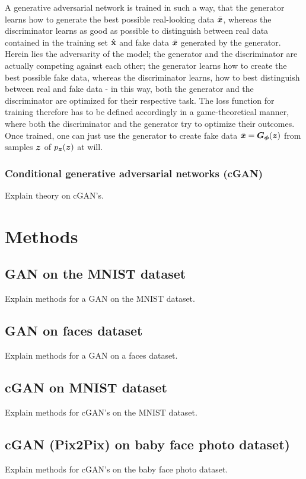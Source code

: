 \documentclass[a4paper,10pt, twocolumn]{article}
\begin{document}
A generative adversarial network is trained in such a way, that the generator learns how to generate the best possible real-looking data $\bar{\bm{x}}$, whereas the discriminator learns as good as possible to distinguish between real data contained in the training set $\hat{\boldsymbol{\mathbf{x}}}$ and fake data $\bar{\bm{x}}$ generated by the generator. Herein lies the adversarity of the model; the generator and the discriminator are actually competing against each other; the generator learns how to create the best possible fake data, whereas the discriminator learns, how to best distinguish between real and fake data - in this way, both the generator and the discriminator are optimized for their respective task. The loss function for training therefore has to be defined accordingly in a game-theoretical manner, where both the discriminator and the generator try to optimize their outcomes. Once trained, one can just use the generator to create fake data $\bar{\bm{x}} = \bm{G}_{\bm{\phi}}(\bm{z})$ from samples $\bm{z}$ of $p_{\bm{z}}(\bm{z})$ at will.

\subsubsection{Conditional generative adversarial networks (cGAN)}
Explain theory on cGAN's.


\section{Methods}
\subsection{GAN on the MNIST dataset}
Explain methods for a GAN on the MNIST dataset.

\subsection{GAN on faces dataset}
Explain methods for a GAN on a faces dataset.

\subsection{cGAN on MNIST dataset}
Explain methods for cGAN's on the MNIST dataset.

\subsection{cGAN (Pix2Pix) on baby face photo dataset)}
Explain methods for cGAN's on the baby face photo dataset.
\end{document}
